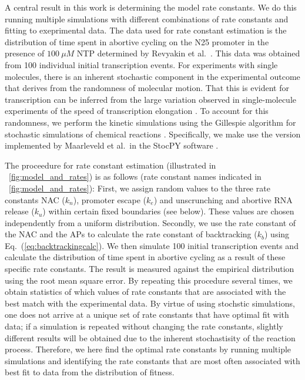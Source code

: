 A central result in this work is determining the model rate constants. We do
this running multiple simulations with different combinations of rate
constants and fitting to exeprimental data. The data used for rate constant
estimation is the distribution of time spent in abortive cycling on the N25
promoter in the presence of $100\ \mu M$ NTP determined by Revyakin et al.\
\cite{revyakin_abortive_2006}. This data was obtained from 100 individual
initial transcription events. For experiments with single molecules, there is
an inherent stochastic component in the experimental outcome that derives from
the randomness of molecular motion. That this is evident for transcription can
be inferred from the large variation observed in single-molecule experiments
of the speed of transcription elongation \cite{adelman_single_2002,
tolic-norrelykke_diversity_2004}. To account for this randomness, we perform
the kinetic simulations using the Gillespie algorithm for stochastic
simulations of chemical reactions \cite{gillespie_exact_1977}. Specifically,
we make use the version implemented by Maarleveld et al.\ in the StocPY
software \cite{maarleveld_stochpy:_2013}.

The proceedure for rate constant estimation (illustrated in
\FIG~\ref{fig:model_and_rates}) is as follows (rate constant names indicated
in \FIG~\ref{fig:model_and_rates}): First, we assign random values to the
three rate constants NAC ($k_n$), promoter escape ($k_e$) and unscrunching and
abortive RNA release ($k_u$) within certain fixed boundaries (see below).
These values are chosen independently from a uniform distribution. Secondly,
we use the rate constant of the NAC and the APs to calculate the rate constant
of backtracking ($k_b$) using Eq.~(\ref{eq:backtrackingcalc}). We then
simulate 100 initial transcription events and calculate the distribution of
time spent in abortive cycling as a result of these specific rate constants.
The result is measured against the empirical distribution
\cite{revyakin_abortive_2006} using the root mean square error. By repeating
this procedure several times, we obtain statistics of which values of rate
constants that are associated with the best match with the experimental data.
By virtue of using stochstic simulations, one does not arrive at a unique set
of rate constants that have optimal fit with data; if a simulation is repeated
without changing the rate constants, slightly different results will be
obtained due to the inherent stochastisity of the reaction process. Therefore,
we here find the optimal rate constants by running multiple simulations and
identifying the rate constants that are most often associated with best fit to
data from the distribution of fitness.

